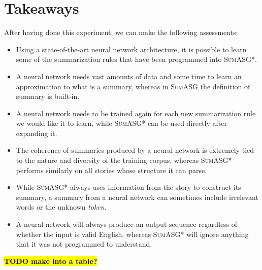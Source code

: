 \section{Takeaways}

After having done this experiment, we can make the following assessments:

\begin{itemize}
\item Using a state-of-the-art neural network architecture, it is possible to learn some of the summarization rules that have been programmed into \textsc{SumASG*}.
\item A neural network needs vast amounts of data and some time to learn an approximation to what is a summary, whereas in \textsc{SumASG} the definition of summary is built-in.
\item A neural network needs to be trained again for each new summarization rule we would like it to learn, while \textsc{SumASG*} can be used directly after expanding it.
\item The coherence of summaries produced by a neural network is extremely tied to the nature and diversity of the training corpus, whereas \textsc{SumASG*} performs similarly on all stories whose structure it can parse.
\item While \textsc{SumASG*} always uses information from the story to construct its summary, a summary from a neural network can sometimes include irrelevant words or the unknown \textit{token}.
\item A neural network will always produce an output sequence regardless of whether the input is valid English, whereas \textsc{SumASG*} will ignore anything that it was not programmed to understand.
\end{itemize}

\textcolor{red}{\textbf{\hl{TODO make into a table?}}}